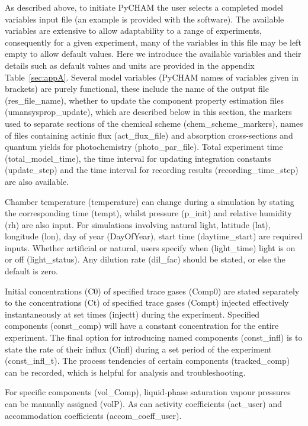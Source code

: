 \documentclass[gmd, manuscript]{copernicus}
\begin{document}
As described above, to initiate PyCHAM the user selects a completed model variables input file (an example is provided with the software).  The available variables are extensive to allow adaptability to a range of experiments, consequently for a given experiment, many of the variables in this file may be left empty to allow default values.  Here we introduce the available variables and their details such as default values and units are provided in the appendix Table~\ref{sec:appA}.  Several model variables (PyCHAM names of variables given in brackets) are purely functional, these include the name of the output file (res\_file\_name), whether to update the component property estimation files (umansysprop\_update), which are described below in this section, the markers used to separate sections of the chemical scheme (chem\_scheme\_markers), names of files containing actinic flux (act\_flux\_file) and absorption cross-sections and quantum yields for photochemistry (photo\_par\_file).  Total experiment time (total\_model\_time), the time interval for updating integration constants (update\_step) and the time interval for recording results (recording\_time\_step) are also available.

Chamber temperature (temperature) can change during a simulation by stating the corresponding time (tempt), whilst pressure (p\_init) and relative humidity (rh) are also input.  For simulations involving natural light, latitude (lat), longitude (lon), day of year (DayOfYear), start time (daytime\_start) are required inputs.  Whether artificial or natural, users specify when (light\_time) light is on or off (light\_status).  Any dilution rate (dil\_fac) should be stated, or else the default is zero.

Initial concentrations (C0) of specified trace gases (Comp0) are stated separately to the concentrations (Ct) of specified trace gases (Compt) injected effectively instantaneously at set times (injectt) during the experiment.  Specified components (const\_comp) will have a constant concentration for the entire experiment.  The final option for introducing named components (const\_infl) is to state the rate of their influx (Cinfl) during a set period of the experiment (const\_infl\_t).  The process tendencies of certain components (tracked\_comp) can be recorded, which is helpful for analysis and troubleshooting.

For specific components (vol\_Comp), liquid-phase saturation vapour pressures can be manually assigned (volP).  As can activity coefficients (act\_user) and accommodation coefficients (accom\_coeff\_user).
\end{document}
